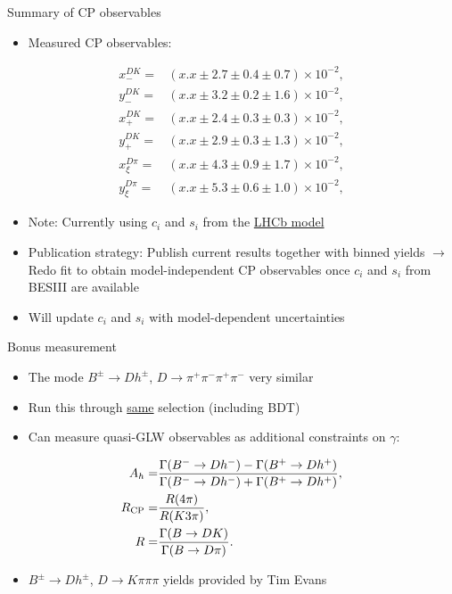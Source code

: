 \documentclass{beamer}
\begin{document}
\begin{frame}{Summary of CP observables}
  \begin{itemize}
    \item{Measured CP observables:}
  \end{itemize}
  \begin{align*}
    x_-^{DK} =& (x.x \pm 2.7 \pm 0.4 \pm 0.7)\times 10^{-2}, \\
    y_-^{DK} =& (x.x \pm 3.2 \pm 0.2 \pm 1.6)\times 10^{-2}, \\
    x_+^{DK} =& (x.x \pm 2.4 \pm 0.3 \pm 0.3)\times 10^{-2}, \\
    y_+^{DK} =& (x.x \pm 2.9 \pm 0.3 \pm 1.3)\times 10^{-2}, \\
    x_\xi^{D\pi} =& (x.x \pm 4.3 \pm 0.9 \pm 1.7)\times 10^{-2}, \\
    y_\xi^{D\pi} =& (x.x \pm 5.3 \pm 0.6 \pm 1.0)\times 10^{-2},
  \end{align*}
  \vspace{-0.5cm}
  \begin{itemize}
    \item{Note: Currently using $c_i$ and $s_i$ from the \underline{LHCb model}}
    \item{Publication strategy: Publish current results together with binned yields $\to$ Redo fit to obtain model-independent CP observables once $c_i$ and $s_i$ from BESIII are available}
    \item{Will update $c_i$ and $s_i$ with model-dependent uncertainties}
  \end{itemize}
\end{frame}

\begin{frame}{Bonus measurement}
  \begin{itemize}
    \setlength\itemsep{1em}
    \item{The mode $B^\pm\to Dh^\pm$, $D\to\pi^+\pi^-\pi^+\pi^-$ very similar}
    \item{Run this through \underline{same} selection (including BDT)}
    \item{Can measure quasi-GLW observables as additional constraints on $\gamma$:}
  \end{itemize}
  \begin{align*}
    A_h =& \frac{\Gamma(B^-\to Dh^-) - \Gamma(B^+\to Dh^+)}{\Gamma(B^-\to Dh^-) + \Gamma(B^+\to Dh^+)}, \\
    R_{\rm CP} =& \frac{R(4\pi)}{R(K3\pi)}, \\
    R =& \frac{\Gamma(B\to DK)}{\Gamma(B\to D\pi)}.
  \end{align*}
  \begin{itemize}
    \item{$B^\pm\to Dh^\pm$, $D\to K\pi\pi\pi$ yields provided by Tim Evans}
  \end{itemize}
\end{frame}
\end{document}
